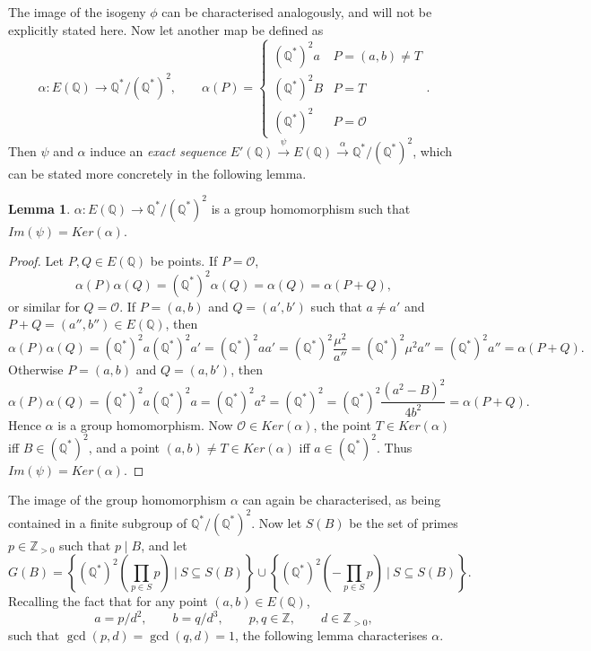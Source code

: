 \documentclass{article}
\newcommand{\Z}{\mathbb{Z}}
\newcommand{\Q}{\mathbb{Q}}
\newcommand{\rb}[1]{\left( #1 \right)}
\newcommand{\cb}[1]{\left\{ #1 \right\}}
\theoremstyle{definition}
\newtheorem{lemma}[proposition]{Lemma}
\begin{document}
The image of the isogeny $ \phi $ can be characterised analogously, and will not be explicitly stated here. Now let another map be defined as
$$ \alpha : E\rb{\Q} \to \Q^* / \rb{\Q^*}^2, \qquad \alpha\rb{P} = \begin{cases} \rb{\Q^*}^2a & P = \rb{a, b} \ne T \\ \rb{\Q^*}^2B & P = T \\ \rb{\Q^*}^2 & P = \mathcal{O} \end{cases}. $$
Then $ \psi $ and $ \alpha $ induce an \emph{exact sequence} $ E'\rb{\Q} \xrightarrow{\psi} E\rb{\Q} \xrightarrow{\alpha} \Q^* / \rb{\Q^*}^2 $, which can be stated more concretely in the following lemma.

\begin{lemma}
$ \alpha : E\rb{\Q} \to \Q^* / \rb{\Q^*}^2 $ is a group homomorphism such that $ Im\rb{\psi} = Ker\rb{\alpha} $.
\end{lemma}

\begin{proof}
Let $ P, Q \in E\rb{\Q} $ be points. If $ P = \mathcal{O} $,
$$ \alpha\rb{P}\alpha\rb{Q} = \rb{\Q^*}^2\alpha\rb{Q} = \alpha\rb{Q} = \alpha\rb{P + Q}, $$
or similar for $ Q = \mathcal{O} $. If $ P = \rb{a, b} $ and $ Q = \rb{a', b'} $ such that $ a \ne a' $ and $ P + Q = \rb{a'', b''} \in E\rb{\Q} $, then
$$ \alpha\rb{P}\alpha\rb{Q} = \rb{\Q^*}^2a\rb{\Q^*}^2a' = \rb{\Q^*}^2aa' = \rb{\Q^*}^2\dfrac{\mu^2}{a''} = \rb{\Q^*}^2\mu^2a'' = \rb{\Q^*}^2a'' = \alpha\rb{P + Q}. $$
Otherwise $ P = \rb{a, b} $ and $ Q = \rb{a, b'} $, then
$$ \alpha\rb{P}\alpha\rb{Q} = \rb{\Q^*}^2a\rb{\Q^*}^2a = \rb{\Q^*}^2a^2 = \rb{\Q^*}^2 = \rb{\Q^*}^2\dfrac{\rb{a^2 - B}^2}{4b^2} = \alpha\rb{P + Q}. $$
Hence $ \alpha $ is a group homomorphism. Now $ \mathcal{O} \in Ker\rb{\alpha} $, the point $ T \in Ker\rb{\alpha} $ iff $ B \in \rb{\Q^*}^2 $, and a point $ \rb{a, b} \ne T \in Ker\rb{\alpha} $ iff $ a \in \rb{\Q^*}^2 $. Thus $ Im\rb{\psi} = Ker\rb{\alpha} $.
\end{proof}

The image of the group homomorphism $ \alpha $ can again be characterised, as being contained in a finite subgroup of $ \Q^* / \rb{\Q^*}^2 $. Now let $ S\rb{B} $ be the set of primes $ p \in \Z_{> 0} $ such that $ p \mid B $, and let
$$ G\rb{B} = \cb{\rb{\Q^*}^2\rb{\prod_{p \in S} p} \ \Bigg| \ S \subseteq S\rb{B}} \cup \cb{\rb{\Q^*}^2\rb{-\prod_{p \in S} p} \ \Bigg| \ S \subseteq S\rb{B}}. $$
Recalling the fact that for any point $ \rb{a, b} \in E\rb{\Q} $,
$$ a = p / d^2, \qquad b = q / d^3, \qquad p, q \in \Z, \qquad d \in \Z_{> 0}, $$ such that $ \gcd\rb{p, d} = \gcd\rb{q, d} = 1 $, the following lemma characterises $ \alpha $.
\end{document}
